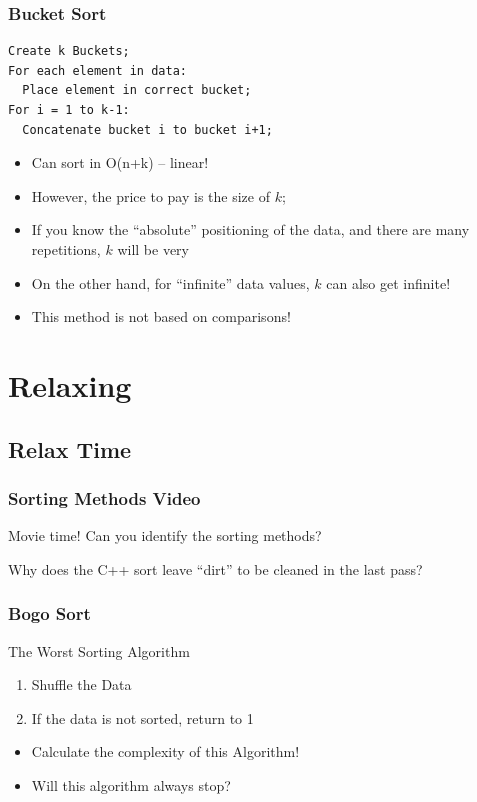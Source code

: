 \documentclass{beamer}
\begin{document}
\begin{frame}
  \frametitle{Bucket Sort}

  \begin{block}{}
    {\smaller
\begin{verbatim}
Create k Buckets;
For each element in data:
  Place element in correct bucket;
For i = 1 to k-1:
  Concatenate bucket i to bucket i+1;
\end{verbatim}
}
  \end{block}
  \bigskip

  \begin{itemize}
  \item Can sort in O(n+k) -- linear!
  \item However, the price to pay is the size of $k$;
  \item If you know the ``absolute'' positioning of the data, and
    there are many repetitions, $k$ will be very 
  \item On the other hand, for ``infinite'' data values, $k$ can also get infinite!
  \item This method is not based on comparisons!
  \end{itemize}
\end{frame}

\section{Relaxing}
\subsection{Relax Time}

\begin{frame}
  \frametitle{Sorting Methods Video}
  Movie time! Can you identify the sorting methods?
  \vfill
  
  Why does the C++ sort leave ``dirt'' to be cleaned in the last pass?
\end{frame}


\begin{frame}
  \frametitle{Bogo Sort}
  \begin{block}{The Worst Sorting Algorithm}
    \begin{enumerate}
      \item Shuffle the Data
      \item If the data is not sorted, return to 1
    \end{enumerate}
  \end{block}
  \bigskip
  
  \begin{itemize}
  \item Calculate the complexity of this Algorithm!
  \item Will this algorithm always stop?
  \end{itemize}
\end{frame}
\end{document}
